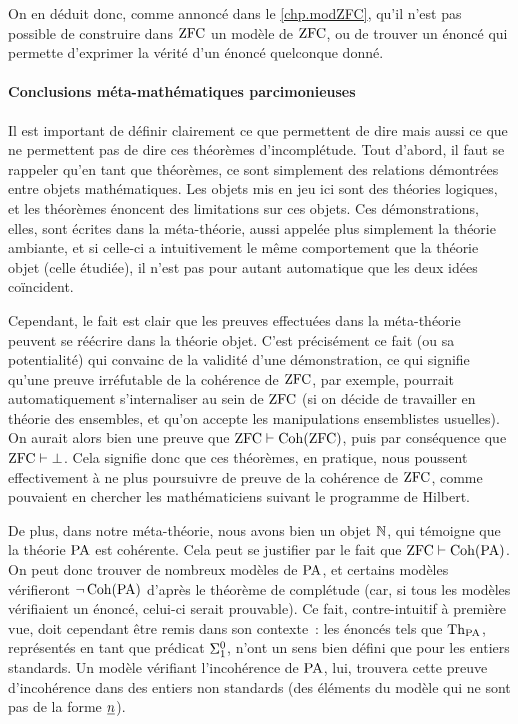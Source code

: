On en déduit donc, comme annoncé dans le \cref{chp.modZFC}, qu'il n'est pas
possible de construire dans $\operatorname{ZFC}$ un modèle de $\operatorname{ZFC}$, ou de trouver un énoncé
qui permette d'exprimer la vérité d'un énoncé quelconque donné.

\paragraph{Conclusions méta-mathématiques parcimonieuses}
Il est important de définir clairement ce que permettent de dire mais aussi ce
que ne permettent pas de dire ces théorèmes d'incomplétude. Tout d'abord,
il faut se rappeler qu'en tant que théorèmes, ce sont simplement des relations
démontrées entre objets mathématiques. Les objets mis en jeu ici sont des
théories logiques, et les théorèmes énoncent des limitations sur ces objets.
Ces démonstrations, elles, sont écrites dans la méta-théorie, aussi appelée plus
simplement la théorie ambiante, et si celle-ci a intuitivement le même
comportement que la théorie objet (celle étudiée), il n'est pas pour autant
automatique que les deux idées coïncident.

Cependant, le fait est clair que les preuves effectuées dans la méta-théorie
peuvent se réécrire dans la théorie objet. C'est précisément ce fait (ou sa
potentialité) qui convainc de la validité d'une démonstration, ce qui signifie
qu'une preuve irréfutable de la cohérence de $\operatorname{ZFC}$, par exemple, pourrait
automatiquement s'internaliser au sein de $\operatorname{ZFC}$ (si on décide de travailler
en théorie des ensembles, et qu'on accepte les manipulations ensemblistes
usuelles). On aurait alors bien une preuve que $\operatorname{ZFC} \vdash \operatorname{Coh}(\operatorname{ZFC})$, puis
par conséquence que $\operatorname{ZFC} \vdash \bot$. Cela signifie donc que ces théorèmes,
en pratique, nous poussent effectivement à ne plus poursuivre de preuve de
la cohérence de $\operatorname{ZFC}$, comme pouvaient en chercher les mathématiciens suivant
le programme de Hilbert.

De plus, dans notre méta-théorie, nous avons bien un objet $\mathbb N$, qui témoigne
que la théorie $\operatorname{PA}$ est cohérente. Cela peut se justifier par le fait
que $\operatorname{ZFC} \vdash \operatorname{Coh}(\operatorname{PA})$. On peut donc trouver de nombreux modèles
de $\operatorname{PA}$, et certains modèles vérifieront $\lnot\operatorname{Coh}(\operatorname{PA})$
d'après le théorème de complétude (car, si tous les modèles vérifiaient un
énoncé, celui-ci serait prouvable). Ce fait, contre-intuitif à
première vue, doit cependant être remis dans son contexte~: les énoncés tels que
$\operatorname{Th}_{\operatorname{PA}}$, représentés en tant que prédicat $\Sigma^0_{1}$, n'ont
un sens bien défini que pour les entiers standards. Un modèle vérifiant
l'incohérence de $\operatorname{PA}$, lui, trouvera cette preuve d'incohérence dans
des entiers non standards (des éléments du modèle qui ne sont pas de la forme
$\underline{n}$).

